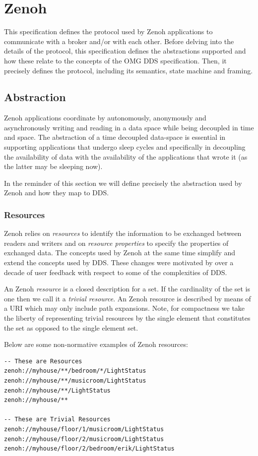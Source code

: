 \documentclass[a4paper,oneside,article]{memoir}
\begin{document}
\chapter{Zenoh}

This specification defines the protocol used by Zenoh applications to communicate with a broker
and/or with each other.  Before delving into the details of the protocol, this specification defines
the abstractions supported and how these relate to the concepts of the OMG DDS specification.  Then,
it precisely defines the protocol, including its semantics, state machine and framing.

\section{Abstraction}

Zenoh applications coordinate by autonomously, anonymously and asynchronously writing and reading in
a data space while being decoupled in time and space.  The abstraction of a time decoupled
data-space is essential in supporting applications that undergo sleep cycles and specifically in
decoupling the availability of data with the availability of the applications that wrote it (as the
latter may be sleeping now).

In the reminder of this section we will define precisely the abstraction used by Zenoh and how they
map to DDS.

\subsection{Resources}

Zenoh relies on \emph{resources} to identify the information to be exchanged between readers and
writers and on \emph{resource properties} to specify the properties of exchanged data.  The concepts
used by Zenoh at the same time simplify and extend the concepts used by DDS.  These changes were
motivated by over a decade of user feedback with respect to some of the complexities of DDS.

An Zenoh \emph{resource} is a closed description for a set.  If the cardinality of the set is one
then we call it a \emph{trivial resource}.  An Zenoh resource is described by means of a URI which
may only include path expansions.  Note, for compactness we take the liberty of representing trivial
resources by the single element that constitutes the set as opposed to the single element set.

Below are some non-normative examples of Zenoh resources:
\begin{verbatim}
-- These are Resources
zenoh://myhouse/**/bedroom/*/LightStatus 
zenoh://myhouse/**/musicroom/LightStatus
zenoh://myhouse/**/LightStatus
zenoh://myhouse/**

-- These are Trivial Resources
zenoh://myhouse/floor/1/musicroom/LightStatus
zenoh://myhouse/floor/2/musicroom/LightStatus
zenoh://myhouse/floor/2/bedroom/erik/LightStatus
\end{verbatim}
\end{document}
